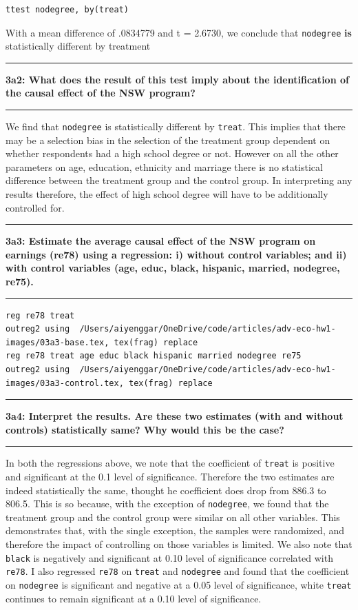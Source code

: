 \documentclass[12pt]{article}
\newcommand\question[2]{\vspace{1em}\hrule\vspace{1em}\textbf{#1: #2}\vspace{1em}\hrule\vspace{1em}}
\begin{document}
\begin{lstlisting}
ttest nodegree, by(treat)
\end{lstlisting}
With a mean difference of  .0834779 and t =  2.6730, we conclude that \verb|nodegree| \textbf{is}  statistically different by treatment


\question{3a2}{ What does the result of this test imply about the identification of the causal effect of the NSW program?  }
We find that \verb|nodegree| is statistically different by \verb|treat|. This implies that there may be a selection bias in the selection of the treatment group dependent on whether respondents had a high school degree or not. However on all the other parameters on age, education, ethnicity and marriage there is no statistical difference between the treatment group and the control group. In interpreting any results therefore, the effect of high school degree will have to be additionally controlled for.

\question{3a3}{Estimate the average causal effect of the NSW program on earnings (re78) using a regression: i) without control variables; and ii) with control variables (age, educ, black, hispanic, married, nodegree, re75).  }
\begin{lstlisting}
reg re78 treat
outreg2 using  /Users/aiyenggar/OneDrive/code/articles/adv-eco-hw1-images/03a3-base.tex, tex(frag) replace
reg re78 treat age educ black hispanic married nodegree re75
outreg2 using  /Users/aiyenggar/OneDrive/code/articles/adv-eco-hw1-images/03a3-control.tex, tex(frag) replace
\end{lstlisting}



\question{3a4}{Interpret the results.  Are these two estimates (with and without controls) statistically same?  Why would this be the case?}
In both the regressions above, we note that the coefficient of \verb|treat| is positive and significant at the 0.1 level of significance. Therefore the two estimates are indeed statistically the same, thought he coefficient does drop from 886.3 to 806.5. This is so because, with the exception of \verb|nodegree|, we found that the treatment group and the control group were similar on all other variables. This demonstrates that, with the single exception, the samples were randomized, and therefore the impact of controlling on those variables is limited. We also note that \verb|black| is negatively and significant at 0.10 level of significance correlated with \verb|re78|. I also regressed \verb|re78| on \verb|treat| and \verb|nodegree| and found that the coefficient on \verb|nodegree| is significant and negative at a 0.05 level of significance, white \verb|treat| continues to remain significant at a 0.10 level of significance.
\end{document}
